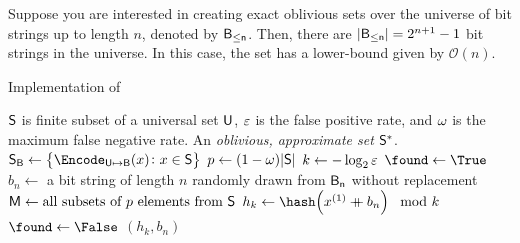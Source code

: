 \documentclass[ ../main.tex]{subfiles}
\begin{document}
Suppose you are interested in creating exact oblivious sets over the universe of bit strings up to length $n$, denoted by $\Set{B}[\leq n]$. Then, there are $\Card{\Set{B}[\leq n]} = 2^{n+1} - 1$ bit strings in the universe. In this case, the set has a lower-bound given by
$\mathcal{O}(n)$.

\begin{algorithm}
    \caption{Implementation of \protect\MakeApproxSet}
    \label{alg:makeset}
    \DontPrintSemicolon
    \KwIn
    {
        $\Set{S}$ is finite subset of a universal set $\Set{U}$, $\varepsilon$ is the false positive rate, and $\omega$ is the maximum false negative rate.
    }
    \KwOut
    {
        An \emph{oblivious, approximate set} $\Set{S}^*$.
    }
    {
        $\Set{S}_{\Set{B}} \gets \left\{\Encode_{\Set{U} \mapsto \Set{B}}(x) \colon x \in \Set{S}\right\}$\;
        $p \gets (1 - \fnrate) \Card{\Set{S}}$\;
        $k \gets -\log_2 \varepsilon$\;
        {
            {
                $\found \gets \True$\;
                $b_n \gets $ a bit string of length $n$ randomly drawn from $\Set{B}[n]$ without replacement\;
                $\Set{M} \gets \text{all subsets of $p$ elements from $\Set{S}$}$\;
                {
                    $h_k \gets \hash\!\left(x^{(1)} \catop b_n\right) \mod k$\;
                    {
                        {
                            $\found \gets \False$\;
                        }
                    }
                }
                \If{\found}
                {
                    \Return $(h_k, b_n)$\;
                }
            }
        }
    }
\end{algorithm}
\end{document}
